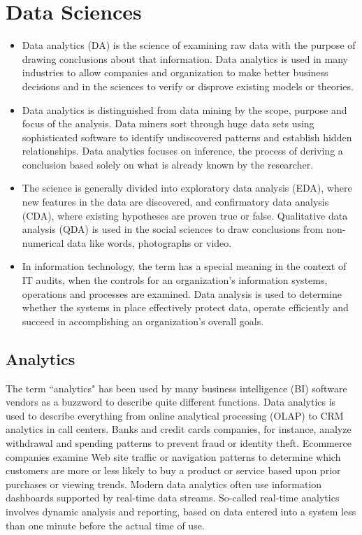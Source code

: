﻿\documentclass[]{report}
\begin{document}
  \medskip

\section*{Data Sciences}
\begin{itemize}
\item Data analytics (DA) is the science of examining raw data with the purpose of drawing conclusions about that information. Data analytics is used in many industries to allow companies and organization to make better business decisions and in the sciences to verify or disprove existing models or theories. 
\item Data analytics is distinguished from data mining by the scope, purpose and focus of the analysis. Data miners sort through huge data sets using sophisticated software to identify undiscovered patterns and establish hidden relationships. Data analytics focuses on inference, the process of deriving a conclusion based solely on what is already known by the researcher.

\item The science is generally divided into exploratory data analysis (EDA), where new features in the data are discovered, and confirmatory data analysis (CDA), where existing hypotheses are proven true or false. Qualitative data analysis (QDA) is used in the social sciences to draw conclusions from non-numerical data like words, photographs or video. 
\item In information technology, the term has a special meaning in the context of IT audits, when the controls for an organization's information systems, operations and processes are examined. Data analysis is used to determine whether the systems in place effectively protect data, operate efficiently and succeed in accomplishing an organization's overall goals.
\end{itemize}
    \subsection*{ Analytics }

The term ``analytics" has been used by many business intelligence (BI) software vendors as a buzzword to describe quite different functions. Data analytics is used to describe everything from online analytical processing (OLAP) to CRM analytics in call centers. Banks and credit cards companies, for instance, analyze withdrawal and spending patterns to prevent fraud or identity theft. Ecommerce companies examine Web site traffic or navigation patterns to determine which customers are more or less likely to buy a product or service based upon prior purchases or viewing trends. Modern data analytics often use information dashboards supported by real-time data streams. So-called real-time analytics involves dynamic analysis and reporting, based on data entered into a system less than one minute before the actual time of use.
\end{document}
